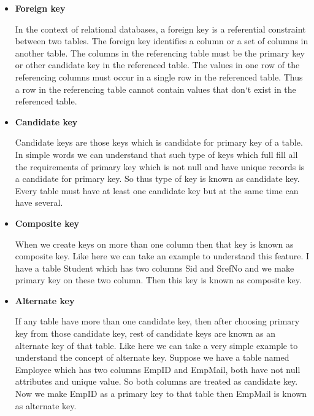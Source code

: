 \begin{itemize}
\item {\bf  Foreign key}

 In the context of relational databases, a foreign key is a referential constraint between two tables. The foreign key identifies a column or a set of columns in another table. The columns in the referencing table must be the primary key or other candidate key in the referenced table. The values in one row of the referencing columns must occur in a single row in the referenced table. Thus a row in the referencing table cannot contain values that don‘t exist in the referenced table.
\end{itemize}


\begin{itemize}
\item {\bf  Candidate key}

Candidate keys are those keys which is candidate for primary key of a table. In simple words we can understand that such type of keys which full fill all the requirements of primary key which is not null and have unique records is a candidate for primary key. So thus type of key is known as candidate key. Every table must have at least one candidate key but at the same time can have several.
\end{itemize}

\begin{itemize}
\item {\bf  Composite key}

When we create keys on more than one column then that key is known as composite key. Like here we can take an example to understand this feature. I have a table Student which has two columns Sid and SrefNo and we make primary key on these two column. Then this key is known as composite key.
\end{itemize}


\begin{itemize}
\item {\bf  Alternate key}

If any table have more than one candidate key, then after choosing primary key from those candidate key, rest of candidate keys are known as an alternate key of  that table. Like here we can take a very simple example to understand the concept of alternate key. Suppose we have a table named Employee which has two columns EmpID and EmpMail, both have not null attributes and unique value. So both columns are treated as candidate key. Now we make EmpID as a primary key to that table then EmpMail is known as alternate key.
\end{itemize}

